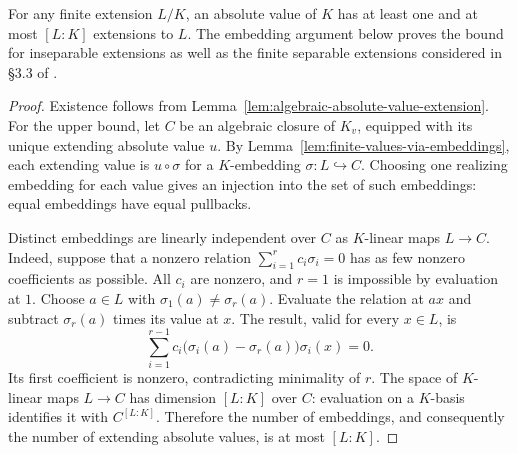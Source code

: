 \begin{lemma}\label{lem:finite-extension-count}
\leanok
{}
For any finite extension $L/K$, an absolute value of $K$ has at least one
and at most $[L:K]$ extensions to $L$. The embedding argument below proves
the bound for inseparable extensions as well as the finite separable
extensions considered in \S3.3 of \cite{chen-moriwaki}.
\end{lemma}
\begin{proof}
Existence follows from Lemma~\ref{lem:algebraic-absolute-value-extension}.
For the upper bound, let $C$ be an algebraic closure of $K_v$, equipped
with its unique extending absolute value $u$. By
Lemma~\ref{lem:finite-values-via-embeddings}, each extending value is
$u\circ\sigma$ for a $K$-embedding $\sigma:L\hookrightarrow C$.
Choosing one realizing embedding for each value gives an injection into
the set of such embeddings: equal embeddings have equal pullbacks.

Distinct embeddings are linearly independent over $C$ as $K$-linear
maps $L\to C$. Indeed, suppose that a nonzero relation
$\sum_{i=1}^r c_i\sigma_i=0$ has as few nonzero coefficients as possible.
All $c_i$ are nonzero, and $r=1$ is impossible by evaluation at $1$.
Choose $a\in L$ with $\sigma_1(a)\ne\sigma_r(a)$. Evaluate the relation
at $ax$ and subtract $\sigma_r(a)$ times its value at $x$. The result,
valid for every $x\in L$, is
\[
 \sum_{i=1}^{r-1}c_i\bigl(\sigma_i(a)-\sigma_r(a)\bigr)\sigma_i(x)=0.
\]
Its first coefficient is nonzero, contradicting minimality of $r$.
The space of $K$-linear maps $L\to C$ has dimension $[L:K]$ over $C$:
evaluation on a $K$-basis identifies it with $C^{[L:K]}$. Therefore the
number of embeddings, and consequently the number of extending absolute
values, is at most $[L:K]$.
\end{proof}

